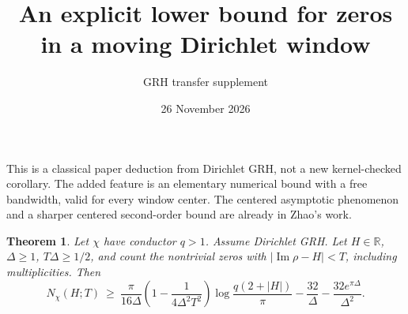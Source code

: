 \documentclass[11pt]{article}
\title{An explicit lower bound for zeros in a moving Dirichlet window}
\author{GRH transfer supplement}
\date{26 November 2026}
\newtheorem{theorem}{Theorem}
\begin{document}
\maketitle
\noindent This is a classical paper deduction from Dirichlet GRH, not a new kernel-checked
corollary. The added feature is an elementary numerical bound with a free bandwidth,
valid for every window center. The centered asymptotic phenomenon and a sharper centered
second-order bound are already in Zhao's work.
\begin{theorem}
Let $\chi$ have conductor $q>1$. Assume Dirichlet GRH. Let $H\in\mathbb R$,
$\Delta\ge 1$, $T\Delta\ge 1/2$, and count the nontrivial zeros with
$|\operatorname{Im}\rho-H|<T$, including multiplicities. Then
\[
 N_\chi(H;T)\ \ge\
 \frac{\pi}{16\Delta}\left(1-\frac{1}{4\Delta^2T^2}\right)
 \log\frac{q(2+|H|)}{\pi}
 -\frac{32}{\Delta}-\frac{32 e^{\pi\Delta}}{\Delta^2}.
\]
\end{theorem}
\end{document}
